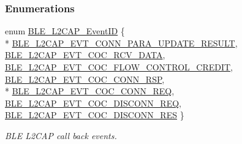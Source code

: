 \subsubsection*{Enumerations}
\begin{DoxyCompactItemize}
\item 
enum \hyperlink{group___b_l_e___l2_c_a_p_gab22309c032161491ea67caafd08d5535}{B\+L\+E\+\_\+\+L2\+C\+A\+P\+\_\+\+Event\+ID} \{ \\*
\hyperlink{group___b_l_e___l2_c_a_p_ggab22309c032161491ea67caafd08d5535affb884a7cbaafc3300fa3d7ae6c4cc1b}{B\+L\+E\+\_\+\+L2\+C\+A\+P\+\_\+\+E\+V\+T\+\_\+\+C\+O\+N\+N\+\_\+\+P\+A\+R\+A\+\_\+\+U\+P\+D\+A\+T\+E\+\_\+\+R\+E\+S\+U\+LT}, 
\hyperlink{group___b_l_e___l2_c_a_p_ggab22309c032161491ea67caafd08d5535a3b8f4f16556297b42d66130c34a0b53c}{B\+L\+E\+\_\+\+L2\+C\+A\+P\+\_\+\+E\+V\+T\+\_\+\+C\+O\+C\+\_\+\+R\+C\+V\+\_\+\+D\+A\+TA}, 
\hyperlink{group___b_l_e___l2_c_a_p_ggab22309c032161491ea67caafd08d5535a274ce128883754a73d3c71369dac4469}{B\+L\+E\+\_\+\+L2\+C\+A\+P\+\_\+\+E\+V\+T\+\_\+\+C\+O\+C\+\_\+\+F\+L\+O\+W\+\_\+\+C\+O\+N\+T\+R\+O\+L\+\_\+\+C\+R\+E\+D\+IT}, 
\hyperlink{group___b_l_e___l2_c_a_p_ggab22309c032161491ea67caafd08d5535a99ef05bf684d0266e5fdfe5162f69fbd}{B\+L\+E\+\_\+\+L2\+C\+A\+P\+\_\+\+E\+V\+T\+\_\+\+C\+O\+C\+\_\+\+C\+O\+N\+N\+\_\+\+R\+SP}, 
\\*
\hyperlink{group___b_l_e___l2_c_a_p_ggab22309c032161491ea67caafd08d5535abebb552c37fbc604c811187f13363d3c}{B\+L\+E\+\_\+\+L2\+C\+A\+P\+\_\+\+E\+V\+T\+\_\+\+C\+O\+C\+\_\+\+C\+O\+N\+N\+\_\+\+R\+EQ}, 
\hyperlink{group___b_l_e___l2_c_a_p_ggab22309c032161491ea67caafd08d5535a0e7b9663e49e9574ddff2fdbffc53107}{B\+L\+E\+\_\+\+L2\+C\+A\+P\+\_\+\+E\+V\+T\+\_\+\+C\+O\+C\+\_\+\+D\+I\+S\+C\+O\+N\+N\+\_\+\+R\+EQ}, 
\hyperlink{group___b_l_e___l2_c_a_p_ggab22309c032161491ea67caafd08d5535ae0abaf6376ca19524ea35a629a813a80}{B\+L\+E\+\_\+\+L2\+C\+A\+P\+\_\+\+E\+V\+T\+\_\+\+C\+O\+C\+\_\+\+D\+I\+S\+C\+O\+N\+N\+\_\+\+R\+ES}
 \}\begin{DoxyCompactList}\small\item\em B\+LE L2\+C\+AP call back events. \end{DoxyCompactList}
\end{DoxyCompactItemize}

